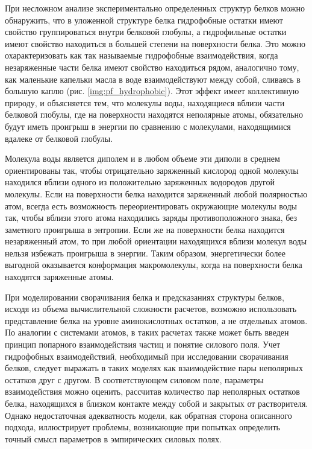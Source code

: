 При несложном анализе экспериментально определенных структур белков можно обнаружить, что в уложенной структуре белка гидрофобные остатки имеют свойство группироваться внутри белковой глобулы, а гидрофильные остатки имеют свойство находиться в большей степени на поверхности белка. Это можно охарактеризовать как так называемые гидрофобные взаимодействия, когда незаряженные части белка имеют свойство находиться рядом, аналогично тому, как маленькие капельки масла в воде взаимодействуют между собой, сливаясь в большую каплю (рис. \ref{img:pf_hydrophobic}). Этот эффект имеет коллективную природу, и объясняется тем, что молекулы воды, находящиеся вблизи части белковой глобулы, где на поверхности находятся неполярные атомы, обязательно будут иметь проигрыш в энергии по сравнению с молекулами, находящимися вдалеке от белковой глобулы. 

Молекула воды является диполем и в любом объеме эти диполи в среднем ориентированы так, чтобы отрицательно заряженный кислород одной молекулы находился вблизи одного из положительно заряженных водородов другой молекулы. Если на поверхности белка находится заряженный любой полярностью атом, всегда есть возможность переориентировать окружающие молекулы воды так, чтобы вблизи этого атома находились заряды противоположного знака, без заметного проигрыша в энтропии. Если же на поверхности белка находится незаряженный атом, то при любой ориентации находящихся вблизи молекул воды нельзя избежать проигрыша в энергии. Таким образом, энергетически более выгодной оказывается конформация макромолекулы, когда на поверхности белка находятся заряженные атомы.

При моделировании сворачивания белка и предсказаниях структуры белков, исходя из объема вычислительной сложности расчетов, возможно использовать представление белка на уровне аминокислотных остатков, а не отдельных атомов. По аналогии с системами атомов, в таких расчетах также может быть введен принцип попарного взаимодействия частиц и понятие силового поля. Учет гидрофобных взаимодействий, необходимый при исследовании сворачивания белков, следует выражать в таких моделях как взаимодействие пары неполярных остатков друг с другом. В соответствующем силовом поле, параметры взаимодействия можно оценить, рассчитав количество пар неполярных остатков белка, находящихся в близком контакте между собой и закрытых от растворителя. Однако недостаточная адекватность модели, как обратная сторона описанного подхода, иллюстрирует проблемы, возникающие при попытках определить точный смысл параметров в эмпирических силовых полях. 


